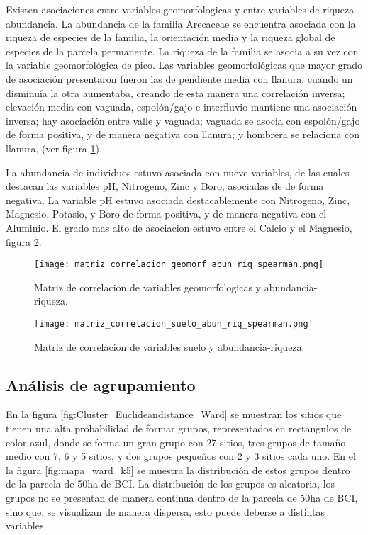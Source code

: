 \documentclass[11pt,]{article}
\begin{document}
Existen asociaciones entre variables geomorfologicas y entre variables
de riqueza-abundancia. La abundancia de la familia Arecaceae se
encuentra asociada con la riqueza de especies de la familia, la
orientación media y la riqueza global de especies de la parcela
permanente. La riqueza de la familia se asocia a su vez con la variable
geomorfológica de pico. Las variables geomorfológicas que mayor grado de
asociación presentaron fueron las de pendiente media con llanura, cuando
un disminuía la otra aumentaba, creando de esta manera una correlación
inversa; elevación media con vaguada, espolón/gajo e interfluvio
mantiene una asociación inversa; hay asociación entre valle y vaguada;
vaguada se asocia con espolón/gajo de forma positiva, y de manera
negativa con llanura; y hombrera se relaciona con llanura, (ver figura
\ref{fig:matriz_correlacion_geomorf_abun_riq_spearman}).

La abundancia de individuos estuvo asociada con nueve variables, de las
cuales destacan las variables pH, Nitrogeno, Zinc y Boro, asociadas de
de forma negativa. La variable pH estuvo asociada destacablemente con
Nitrogeno, Zinc, Magnesio, Potasio, y Boro de forma positiva, y de
manera negativa con el Aluminio. El grado mas alto de asociacion estuvo
entre el Calcio y el Magnesio, figura
\ref{fig:matriz_correlacion_suelo_abun_riq_spearman}.

\begin{figure}
\centering
\texttt{[image: matriz\_correlacion\_geomorf\_abun\_riq\_spearman.png]}
\caption{Matriz de correlacion de variables geomorfologicas y
abundancia-riqueza.
\label{fig:matriz_correlacion_geomorf_abun_riq_spearman}}
\end{figure}

\begin{figure}
\centering
\texttt{[image: matriz\_correlacion\_suelo\_abun\_riq\_spearman.png]}
\caption{Matriz de correlacion de variables suelo y abundancia-riqueza.
\label{fig:matriz_correlacion_suelo_abun_riq_spearman}}
\end{figure}

\subsection{Análisis de agrupamiento}\label{anuxe1lisis-de-agrupamiento}

En la figura \ref{fig:Cluster_Euclideandistance_Ward} se muestran los
sitios que tienen una alta probabilidad de formar grupos, representados
en rectangulos de color azul, donde se forma un gran grupo con 27
sitios, tres grupos de tamaño medio con 7, 6 y 5 sitios, y dos grupos
pequeños con 2 y 3 sitios cada uno. En el la figura
\ref{fig:mapa_ward_k5} se muestra la distribución de estos grupos dentro
de la parcela de 50ha de BCI. La distribución de los grupos es
aleatoria, los grupos no se presentan de manera continua dentro de la
parcela de 50ha de BCI, sino que, se visualizan de manera dispersa, esto
puede deberse a distintas variables.
\end{document}
